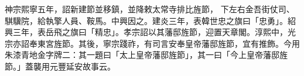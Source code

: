 \begin{pinyinscope}
 神宗熙寧五年，詔新建節並移鎮，並降敕太常寺排比旌節，
 下左右金吾街仗司、騏驥院，給執擎人員、鞍馬。中興因之。建炎三年，表韓世忠之旗曰「忠勇」。紹興三年，表岳飛之旗曰「精忠」。孝宗詔以其藩邸旌節，迎置天章閣。淳熙中，光宗亦詔奉東宮旌節。其後，寧宗踐祚，有司言安奉皇帝藩邸旌節，宜有推飾。今用朱漆青地金字牌二：其一題曰「太上皇帝藩邸旌節」，其一曰「今上皇帝藩邸旌節。」蓋襲用元豐延安故事云。



\end{pinyinscope}